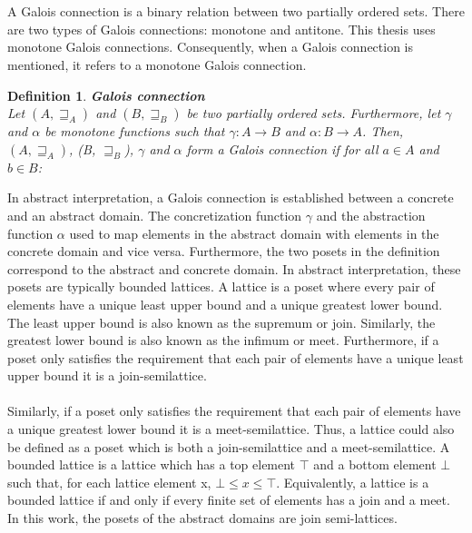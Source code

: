 \documentclass{kththesis}
\newtheorem*{definition}{Definition}
\begin{document}
\\ \\
A Galois connection is a binary relation between two partially ordered sets. There are two types of Galois connections: monotone and antitone. This thesis uses monotone Galois connections. Consequently, when a Galois connection is mentioned, it refers to a monotone Galois connection.
\begin{definition} \textbf{Galois connection}\\
Let $(A, \sqsupseteq_A)$ and $(B, \sqsupseteq_B)$ be two partially ordered sets. Furthermore, let $\gamma$ and $\alpha$ be monotone functions such that  $\gamma : A \rightarrow B$ and $\alpha : B \rightarrow A$. Then, ${(A, \sqsupseteq_A)}$, (B, $\sqsupseteq_B$), $\gamma$ and $\alpha$ form a Galois connection if for all $a \in A$ and $b \in B$:
\end{definition}
\noindent
In abstract interpretation, a Galois connection is established between a concrete and an abstract domain. The concretization function $\gamma$ and the abstraction function $\alpha$ used to map elements in the abstract domain with elements in the concrete domain and vice versa. Furthermore, the two posets in the definition correspond to the abstract and concrete domain. In abstract interpretation, these posets are typically bounded lattices.
\clearpage
\noindent
A lattice is a poset where every pair of elements have a unique least upper bound and a unique greatest lower bound. The least upper bound is also known as the supremum or join. Similarly, the greatest lower bound is also known as the infimum or meet. Furthermore, if a poset only satisfies the requirement that each pair of elements have a unique least upper bound it is a join-semilattice.
\\ \\
Similarly, if a poset only satisfies the requirement that each pair of elements have a unique greatest lower bound it is a meet-semilattice. Thus, a lattice could also be defined as a poset which is both a join-semilattice and a meet-semilattice. A bounded lattice is a lattice which has a top element $\top$ and a bottom element $\bot$ such that, for each lattice element x, $\bot \leq x \leq \top$. Equivalently, a lattice is a bounded lattice if and only if every finite set of elements has a join and a meet. In this work, the posets of the abstract domains are join semi-lattices. 
\end{document}
